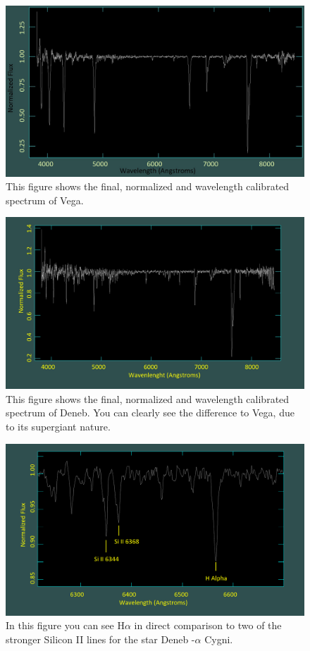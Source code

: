\documentclass{article}
\begin{document}
\begin{figure}[H]
  	\centering
    \includegraphics[width=1.00\textwidth]{spectroscopy/vega_spectrum_calib_norm.jpg}
  	\caption{This figure shows the final, normalized and wavelength calibrated spectrum of Vega. }
  	\label{fig:10}
\end{figure}

\begin{figure}[H]
	\centering
    \includegraphics[width=1.00\textwidth]{spectroscopy/deneb_spec.jpg}
  	\caption{This figure shows the final, normalized and wavelength calibrated spectrum of Deneb. You can clearly see the difference to Vega, due to its supergiant nature.}
  	\label{fig:11}
\end{figure}

\begin{figure}[H]
	\centering
    \includegraphics[width=1.00\textwidth]{spectroscopy/silicon_lines_deneb.png}
  	\caption{In this figure you can see H$\alpha$ in direct comparison to two of the stronger Silicon II lines for the star Deneb {-}$\alpha$ Cygni.}
  	\label{fig:12}
\end{figure}
\end{document}
